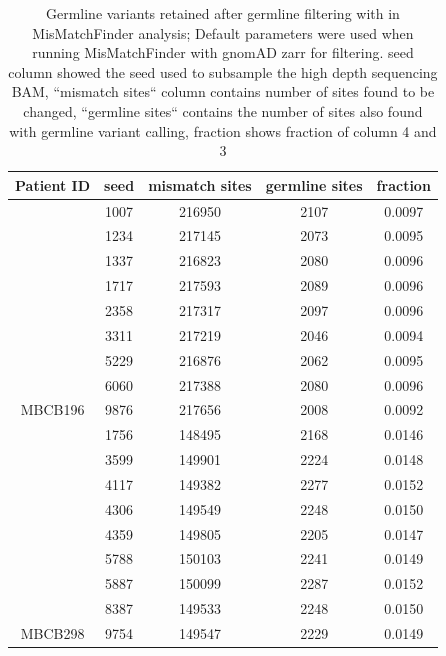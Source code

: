 \begin{table}
\caption[Germline variants retained after germline filtering]{Germline variants retained after germline filtering with in MisMatchFinder analysis; Default parameters were used when running MisMatchFinder with gnomAD zarr for filtering. seed column showed the seed used to subsample the high depth sequencing BAM, ``mismatch sites`` column contains number of sites found to be changed, ``germline sites`` contains the number of sites also found with germline variant calling, fraction shows fraction of column 4 and 3}\label{tab:mmf-germlineArtifacts}
\centering
\begin{tabular}{c|c|c|c|c}
\toprule
\textbf{Patient ID} & \textbf{seed} & \textbf{mismatch sites} & \textbf{germline sites} & \textbf{fraction} \\
\midrule
 & \num{1007} & \num{216950} &  \num{2107} & \num{0.0097}\\ 
 & \num{1234} & \num{217145} &  \num{2073} & \num{0.0095}\\ 
 & \num{1337} & \num{216823} &  \num{2080} & \num{0.0096}\\ 
 & \num{1717} & \num{217593} &  \num{2089} & \num{0.0096}\\ 
 & \num{2358} & \num{217317} &  \num{2097} & \num{0.0096}\\ 
 & \num{3311} & \num{217219} &  \num{2046} & \num{0.0094}\\ 
 & \num{5229} & \num{216876} &  \num{2062} & \num{0.0095}\\ 
 & \num{6060} & \num{217388} &  \num{2080} & \num{0.0096}\\ 
\multirow{-9}{*}{MBCB196} & \num{9876} & \num{217656} &  \num{2008} & \num{0.0092}\\ 
\midrule
 & \num{1756} & \num{148495} &  \num{2168} & \num{0.0146}\\ 
 & \num{3599} & \num{149901} &  \num{2224} & \num{0.0148}\\ 
 & \num{4117} & \num{149382} &  \num{2277} & \num{0.0152}\\ 
 & \num{4306} & \num{149549} &  \num{2248} & \num{0.0150}\\ 
 & \num{4359} & \num{149805} &  \num{2205} & \num{0.0147}\\ 
 & \num{5788} & \num{150103} &  \num{2241} & \num{0.0149}\\ 
 & \num{5887} & \num{150099} &  \num{2287} & \num{0.0152}\\ 
 & \num{8387} & \num{149533} &  \num{2248} & \num{0.0150}\\ 
\multirow{-9}{*}{MBCB298} & \num{9754} & \num{149547} &  \num{2229} & \num{0.0149}\\
\bottomrule
\end{tabular}
\end{table}


